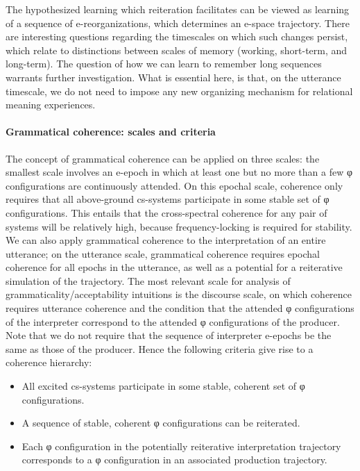   The hypothesized learning which reiteration facilitates can be viewed as learning of a sequence of e-reorganizations, which determines an e-space trajectory. There are interesting questions regarding the timescales on which such changes persist, which relate to distinctions between scales of memory (working, short-term, and long-term). The question of how we can learn to remember long sequences warrants further investigation. What is essential here, is that, on the utterance timescale, we do not need to impose any new organizing mechanism for relational meaning experiences. 

\paragraph{Grammatical coherence: scales and criteria}

The concept of grammatical coherence can be applied on three scales: the smallest scale involves an e-epoch in which at least one but no more than a few φ configurations are continuously attended. On this epochal scale, coherence only requires that all above-ground cs-systems participate in some stable set of φ configurations. This entails that the cross-spectral coherence for any pair of systems will be relatively high, because frequency-locking is required for stability. We can also apply grammatical coherence to the interpretation of an entire utterance; on the utterance scale, grammatical coherence requires epochal coherence for all epochs in the utterance, as well as a potential for a reiterative simulation of the trajectory. The most relevant scale for analysis of grammaticality/acceptability intuitions is the discourse scale, on which coherence requires utterance coherence and the condition that the attended φ configurations of the interpreter correspond to the attended φ configurations of the producer. Note that we do not require that the sequence of interpreter e-epochs be the same as those of the producer. Hence the following criteria give rise to a coherence hierarchy:

\begin{itemize}
\item 
All excited cs-systems participate in some stable, coherent set of φ configurations.
\item 
A sequence of stable, coherent φ configurations can be reiterated.
\item 
Each φ configuration in the potentially reiterative interpretation trajectory corresponds to a φ configuration in an associated production trajectory.
\end{itemize}

